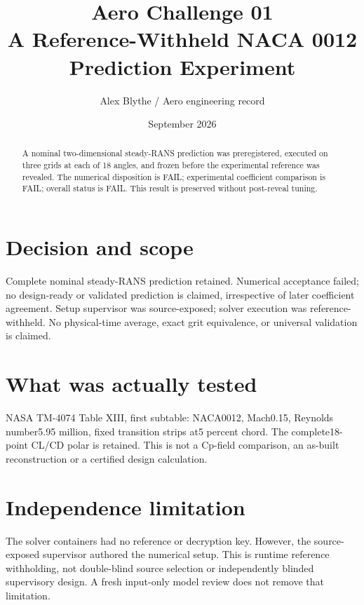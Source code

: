 \documentclass[10pt]{article}
\begin{document}
\title{Aero Challenge 01\\A Reference-Withheld NACA 0012 Prediction Experiment}
\author{Alex Blythe / Aero engineering record}\date{September 2026}\maketitle
\begin{abstract}
A nominal two-dimensional steady-RANS prediction was preregistered, executed on three grids at each of 18 angles, and frozen before the experimental reference was revealed. The numerical disposition is FAIL; experimental coefficient comparison is FAIL; overall status is FAIL. This result is preserved without post-reveal tuning.
\end{abstract}
\section{Decision and scope}
Complete nominal steady-RANS prediction retained. Numerical acceptance failed; no design-ready or validated prediction is claimed, irrespective of later coefficient agreement. Setup supervisor was source-exposed; solver execution was reference-withheld. No physical-time average, exact grit equivalence, or universal validation is claimed.
\section{What was actually tested}
NASA TM-4074 Table XIII, first subtable: NACA0012, Mach0.15, Reynolds number5.95 million, fixed transition strips at5 percent chord. The complete18-point CL/CD polar is retained. This is not a Cp-field comparison, an as-built reconstruction or a certified design calculation.
\section{Independence limitation}
The solver containers had no reference or decryption key. However, the source-exposed supervisor authored the numerical setup. This is runtime reference withholding, not double-blind source selection or independently blinded supervisory design. A fresh input-only model review does not remove that limitation.
\end{document}
